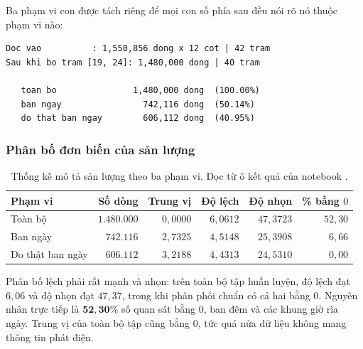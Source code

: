 Ba phạm vi con được tách riêng để mọi con số phía sau đều nói rõ nó thuộc phạm vi nào:

\begingroup
\par{}\vspace{8pt}
\small\renewcommand{\baselinestretch}{1.0}\selectfont
\begin{verbatim}
Doc vao          : 1,550,856 dong x 12 cot | 42 tram
Sau khi bo tram [19, 24]: 1,480,000 dong | 40 tram

   toan bo               1,480,000 dong  (100.00%)
   ban ngay                742,116 dong  (50.14%)
   do that ban ngay        606,112 dong  (40.95%)
\end{verbatim}
\par\vspace{8pt}
\endgroup
\subsubsection{Phân bố đơn biến của sản lượng}

\begin{table}[htbp]
\centering

\small
\begin{tabular}{l r r r r r}
\toprule
\textbf{Phạm vi} & \textbf{Số dòng} & \textbf{Trung vị} & \textbf{Độ lệch} & \textbf{Độ nhọn} & \textbf{\% bằng $0$} \\
\midrule
Toàn bộ          & $1.480.000$ & $0{,}0000$ & $6{,}0612$ & $47{,}3723$ & $52{,}30$ \\
Ban ngày         & $742.116$   & $2{,}7325$ & $4{,}5148$ & $25{,}3908$ & $6{,}66$ \\
Đo thật ban ngày & $606.112$   & $3{,}2188$ & $4{,}4313$ & $24{,}5310$ & $0{,}00$ \\
\bottomrule
\end{tabular}
\caption[Thống kê mô tả sản lượng theo ba phạm vi]{Thống kê mô tả sản lượng theo ba phạm vi. Đọc từ ô kết quả của notebook
.}
\label{tab:eda_mo_ta}
\end{table}

Phân bố lệch phải rất mạnh và nhọn: trên toàn bộ tập huấn luyện, độ lệch đạt $6{,}06$ và độ
nhọn đạt $47{,}37$, trong khi phân phối chuẩn có cả hai bằng $0$. Nguyên nhân trực tiếp là
$\mathbf{52{,}30\%}$ số quan sát bằng $0$, ban đêm và các khung giờ rìa ngày. Trung vị của
toàn bộ tập cũng bằng $0$, tức quá nửa dữ liệu không mang thông tin phát điện.

